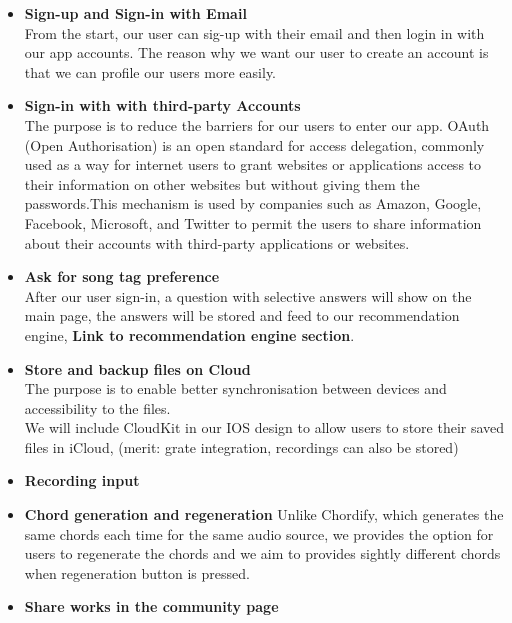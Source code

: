 \begin{itemize}

\item \textbf{Sign-up and Sign-in with Email}
\\From the start, our user can sig-up with their email and then login in with our app accounts. The reason why we want our user to create an account is that we can profile our users more easily.

\item \textbf{Sign-in with with third-party Accounts}
\\ The purpose is to reduce the barriers for our users to enter our app. OAuth (Open Authorisation) is an open standard for access delegation, commonly used as a way for internet users to grant websites or applications access to their information on other websites but without giving them the passwords.This mechanism is used by companies such as Amazon, Google, Facebook, Microsoft, and Twitter to permit the users to share information about their accounts with third-party applications or websites.

\item \textbf{Ask for song tag preference}
\\After our user sign-in, a question with selective answers will show on the main page, the answers will be stored and feed to our recommendation engine, \textbf{Link to recommendation engine section}.

\item \textbf{Store and backup files on Cloud}
\\The purpose is to enable better synchronisation between devices and accessibility to the files. 
\\We will include CloudKit in our IOS design to allow users to store their saved files in iCloud, (merit: grate integration, recordings can also be stored)
\\

\item \textbf{Recording input}
\\

\item \textbf{Chord generation and regeneration}
Unlike Chordify, which generates the same chords each time for the same audio source, we provides the option for users to regenerate the chords and we aim to provides sightly different chords when regeneration button is pressed.

\item \textbf{Share works in the community page}


\end{itemize}

